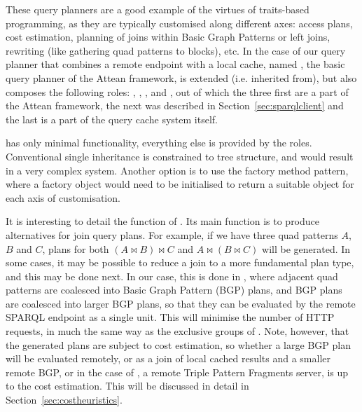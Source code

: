 \documentclass[a4paper, 12pt]{article}
\begin{document}
These query planners are a good example of the virtues of traits-based
programming, as they are typically customised along different axes:
access plans, cost estimation, planning of joins within Basic Graph
Patterns or left joins, rewriting (like gathering quad patterns to
blocks), etc. In the case of our query planner that combines a remote
endpoint with a local cache, named
, the basic query planner of the
Attean framework,  is extended
(i.e. inherited from), but also composes the following roles:
,
,
,
 and
, out of which the three
first are a part of the Attean framework, the next was described in
Section~\ref{sec:sparqlclient} and the last is a part of the
query cache system itself.


 has only minimal functionality,
everything else is provided by the roles. Conventional single
inheritance is constrained to tree structure, and would result in a
very complex system. Another option is to use the factory method
pattern, where a factory object would need to be initialised to return
a suitable object for each axis of customisation. 

It is interesting to detail the function of
. Its main function is to
produce alternatives for join query plans. For example, if we have
three quad patterns $A$, $B$ and $C$, plans for both $ ( A \bowtie B)
\bowtie C $ and $ A \bowtie ( B \bowtie C ) $ will be generated. In
some cases, it may be possible to reduce a join to a more fundamental
plan type, and this may be done next. In our case, this is done in
, where adjacent quad patterns
are coalesced into Basic Graph Pattern (BGP) plans, and BGP plans are
coalesced into larger BGP plans, so that they can be evaluated by the
remote SPARQL endpoint as a single unit. This will minimise the number
of HTTP requests, in much the same way as the exclusive groups of
\cite{springerlink:10.1007/978-3-642-25073-6-38}. Note, however, that
the generated plans are subject to cost estimation, so whether a large
BGP plan will be evaluated remotely, or as a join of local cached
results and a smaller remote BGP, or in the case of
, a remote Triple Pattern
Fragments server, is up to the cost estimation. This will be discussed
in detail in Section~\ref{sec:costheuristics}.




\end{document}
